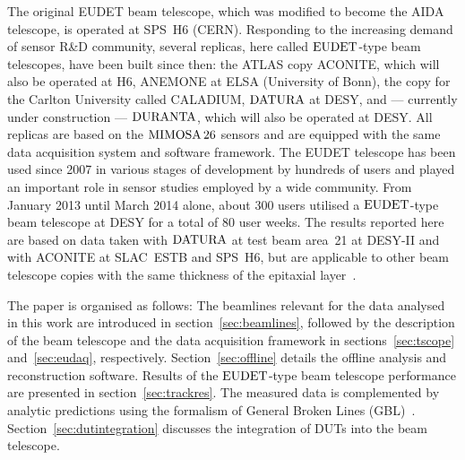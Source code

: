 The original EUDET beam telescope, which was modified to become the AIDA telescope, is operated at SPS~H6 (CERN).
Responding to the increasing demand of sensor R\&D community, several replicas, here called $\textrm{EUDET}$-type beam telescopes, have been built since then:
 the ATLAS copy ACONITE, which will also be operated at H6, ANEMONE at ELSA (University of Bonn), the copy for the Carlton University called CALADIUM, 
 $\textrm{DATURA}$ at DESY, and --- currently under construction --- $\textrm{DURANTA}$, which will also be operated at DESY. 
All replicas are based on the $\textrm{MIMOSA\,26}$ sensors and are equipped with the same data acquisition system and software framework. 
The EUDET telescope has been used since 2007 in various stages of development by hundreds of users and played an important role in sensor studies employed by a wide community. 
From January 2013 until March 2014 alone, about 300 users utilised a $\textrm{EUDET}$-type beam telescope at DESY for a total of 80 user weeks. 
The results reported here are based on data taken with $\textrm{DATURA}$ at test beam area~21 at {DESY-II} and with ACONITE at SLAC~ESTB and SPS~H6, but are applicable to other beam telescope copies with
the same thickness of the epitaxial layer~\cite{desy-tscopes-main}. 

The paper is organised as follows: 
The beamlines relevant for the data analysed in this work are introduced in section~\ref{sec:beamlines}, followed by the description of the beam telescope
 and the data acquisition framework in sections~\ref{sec:tscope} and~\ref{sec:eudaq}, respectively.
Section~\ref{sec:offline} details the offline analysis and reconstruction software. 
Results of the $\textrm{EUDET}$-type beam telescope performance are presented in section~\ref{sec:trackres}. %
The measured data is complemented by analytic predictions using the formalism of General Broken Lines (GBL)~\cite{Blobel20111760,Kleinwort-2012}.
Section~\ref{sec:dutintegration} discusses the integration of DUTs into the beam telescope. 
